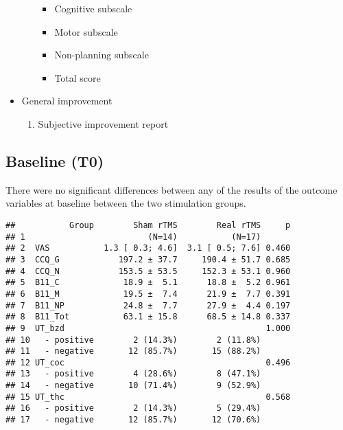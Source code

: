 \documentclass[]{article}
\providecommand{\tightlist}{%
  \setlength{\itemsep}{0pt}\setlength{\parskip}{0pt}}
\begin{document}
\begin{itemize}
\begin{enumerate}
    \begin{itemize}
    \tightlist
    \item
      Cognitive subscale
    \item
      Motor subscale
    \item
      Non-planning subscale
    \item
      Total score
    \end{itemize}
  \end{enumerate}
\item
  General improvement

  \begin{enumerate}
  \def\labelenumi{\arabic{enumi}.}
  \tightlist
  \item
    Subjective improvement report
  \end{enumerate}
\end{itemize}

\hypertarget{baseline-t0}{%
\subsection{Baseline (T0)}\label{baseline-t0}}

There were no significant differences between any of the results of the
outcome variables at baseline between the two stimulation groups.

\begin{verbatim}
##           Group        Sham rTMS        Real rTMS     p
## 1                         (N=14)           (N=17)      
## 2  VAS           1.3 [ 0.3; 4.6]  3.1 [ 0.5; 7.6] 0.460
## 3  CCQ_G            197.2 ± 37.7     190.4 ± 51.7 0.685
## 4  CCQ_N            153.5 ± 53.5     152.3 ± 53.1 0.960
## 5  B11_C             18.9 ±  5.1      18.8 ±  5.2 0.961
## 6  B11_M             19.5 ±  7.4      21.9 ±  7.7 0.391
## 7  B11_NP            24.8 ±  7.7      27.9 ±  4.4 0.197
## 8  B11_Tot           63.1 ± 15.8      68.5 ± 14.8 0.337
## 9  UT_bzd                                         1.000
## 10   - positive        2 (14.3%)        2 (11.8%)      
## 11   - negative       12 (85.7%)       15 (88.2%)      
## 12 UT_coc                                         0.496
## 13   - positive        4 (28.6%)        8 (47.1%)      
## 14   - negative       10 (71.4%)        9 (52.9%)      
## 15 UT_thc                                         0.568
## 16   - positive        2 (14.3%)        5 (29.4%)      
## 17   - negative       12 (85.7%)       12 (70.6%)
\end{verbatim}
\end{document}
